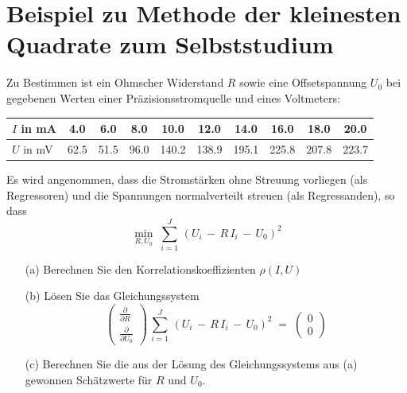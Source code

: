 \section{Beispiel zu Methode der kleinesten Quadrate zum Selbststudium}
Zu Bestimmen ist ein Ohmscher Widerstand $R$ sowie eine Offsetspannung $U_0$ bei gegebenen Werten einer
Präzisionsstromquelle und eines Voltmeters:

\begin{center}
\begin{tabular}{l||c|c|c|c|c|c|c|c|c}
\hline\hline
 $I$ in mA &    4.0 &     6.0 &     8.0 &    10.0 &    12.0 &    14.0 &    16.0 &    18.0 &    20.0\\
\hline
 $U$ in mV &    62.5 &    51.5 &    96.0 &   140.2 &   138.9 &   195.1 &   225.8 &   207.8 &   223.7 \\
\hline\hline
\end{tabular}
\end{center}

Es wird angenommen, dass die Stromstärken ohne Streuung vorliegen (als Regressoren) und die Spannungen normalverteilt
streuen (als Regressanden), so dass
\begin{equation}
\min_{R, U_0} \; \sum_{i = 1}^J \, \left(U_i \, - \, R \, I_i  \, - \,  U_0\right)^2
\label{regrGer}
\end{equation}

\begin{itemize}
\item[(a)] Berechnen Sie den Korrelationskoeffizienten $\rho(I, U)$
\item[(b)] Lösen Sie das Gleichungssystem
\begin{equation}
\left(\begin{array}{c}
\frac{\partial}{\partial R}\\
\frac{\partial}{\partial U_0}
\end{array}\right)
\, \sum_{i = 1}^J \, \left(U_i \, - \, R \, I_i  \, - \,  U_0\right)^2 \; = \;
\left(\begin{array}{c}
0\\
0
\end{array}\right)
\label{regrGerGS}
\end{equation}
\item[(c)] Berechnen Sie die aus der Lösung des Gleichungssystems aus (a) gewonnen Schätzwerte
für $R$ und $U_0$.
\end{itemize}



